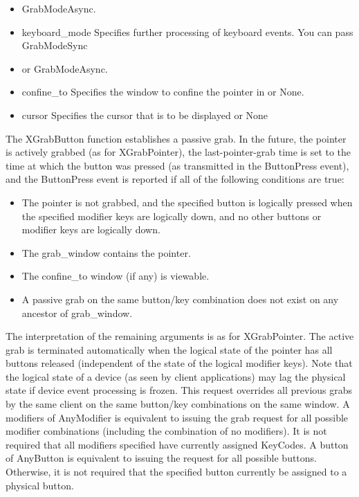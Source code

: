 \documentclass{report}
\begin{document}
\begin{itemize}
\begin{itemize}
                \item GrabModeAsync.
                \item keyboard\_mode Specifies further processing of keyboard events. You can pass GrabModeSync
                \item or GrabModeAsync.
                \item confine\_to Specifies the window to confine the pointer in or None.
                \item cursor Specifies the cursor that is to be displayed or None
            \end{itemize}
            The XGrabButton function establishes a passive grab. In the future, the pointer is actively grabbed (as for XGrabPointer), the last-pointer-grab time is set to the time at which the button was pressed (as transmitted in the ButtonPress event), and the ButtonPress event is reported if all of the following conditions are true:
            \begin{itemize}
                \item The pointer is not grabbed, and the specified button is logically pressed when the specified modifier keys are logically down, and no other buttons or modifier keys are logically down.
                \item The grab\_window contains the pointer.
                \item The confine\_to window (if any) is viewable.
                \item A passive grab on the same button/key combination does not exist on any ancestor of grab\_window.
            \end{itemize}
            The interpretation of the remaining arguments is as for XGrabPointer. The active grab is terminated automatically when the logical state of the pointer has all buttons released (independent of the state of the logical modifier keys).
            \bigbreak \noindent 
            Note that the logical state of a device (as seen by client applications) may lag the physical state if device event processing is frozen.
            \bigbreak \noindent 
            This request overrides all previous grabs by the same client on the same button/key combinations on the same window. A modifiers of AnyModifier is equivalent to issuing the grab request for all possible modifier combinations (including the combination of no modifiers). It is not required that all modifiers specified have currently assigned KeyCodes. A button of AnyButton is equivalent to issuing the request for all possible buttons. Otherwise, it is not required that the specified button currently be assigned to a physical button.

\end{itemize}
\end{document}
